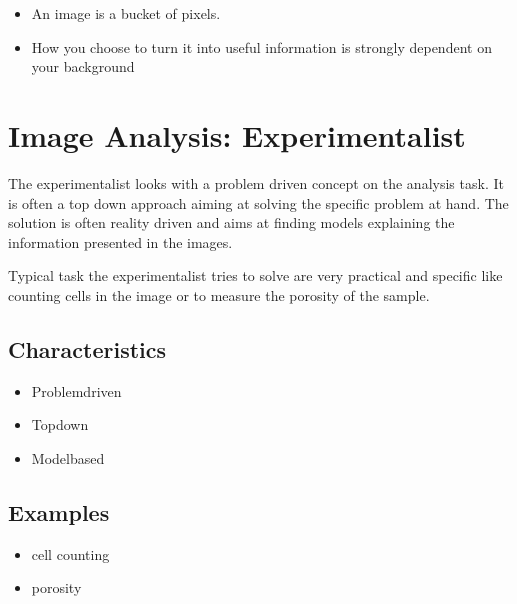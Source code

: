 \documentclass[letterpaper,10pt,english]{sphinxmanual}
\begin{document}
\begin{itemize}
\item {} 
\sphinxAtStartPar
An image is a bucket of pixels.

\item {} 
\sphinxAtStartPar
How you choose to turn it into useful information is strongly dependent on your background

\end{itemize}


\section{Image Analysis: Experimentalist}
\label{\detokenize{01-Introduction:image-analysis-experimentalist}}
\sphinxAtStartPar
The experimentalist looks with a problem driven concept on the analysis task. It is often a top down approach aiming at solving the specific problem at hand. The solution is often reality driven and aims at finding models explaining the information presented in the images.

\sphinxAtStartPar
Typical task the experimentalist tries to solve are very practical and specific like counting cells in the image or to measure the porosity of the sample.




\subsection{Characteristics}
\label{\detokenize{01-Introduction:characteristics}}\begin{itemize}
\item {} 
\sphinxAtStartPar
Problem\sphinxhyphen{}driven

\item {} 
\sphinxAtStartPar
Top\sphinxhyphen{}down

\item {} 
\sphinxAtStartPar
{} Model\sphinxhyphen{}based

\end{itemize}


\subsection{Examples}
\label{\detokenize{01-Introduction:examples}}\begin{itemize}
\item {} 
\sphinxAtStartPar
cell counting

\item {} 
\sphinxAtStartPar
porosity

\end{itemize}
\end{document}
